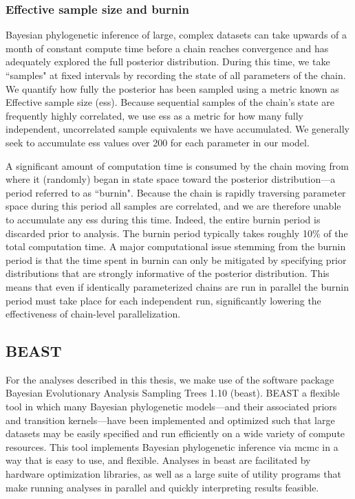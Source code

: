 \subsubsection{Effective sample size and burnin}
Bayesian phylogenetic inference of large, complex datasets can take upwards of a month of constant compute time before a chain reaches convergence and has adequately explored the full posterior distribution.
During this time, we take ``samples" at fixed intervals by recording the state of all parameters of the chain.
We quantify how fully the posterior has been sampled using a metric known as Effective sample size (\gls{ess}).
Because sequential samples of the chain's state are frequently highly correlated, we use \gls{ess} as a metric for how many fully independent, uncorrelated sample equivalents we have accumulated.
We generally seek to accumulate \gls{ess} values over 200 for each parameter in our model. 

A significant amount of computation time is consumed by the chain moving from where it (randomly) began in state space toward the posterior distribution---a period referred to as ``burnin".
Because the chain is rapidly traversing parameter space during this period all samples are correlated, and we are therefore unable to accumulate any \gls{ess} during this time.
Indeed, the entire burnin period is discarded prior to analysis.
The burnin period typically takes roughly 10\% of the total computation time.
A major computational issue stemming from the burnin period is that the time spent in burnin can only be mitigated by specifying prior distributions that are strongly informative of the posterior distribution.
This means that even if identically parameterized chains are run in parallel the burnin period must take place for each independent run, significantly lowering the effectiveness of chain-level parallelization.


\subsection{BEAST}

For the analyses described in this thesis, we make use of the software package Bayesian Evolutionary Analysis Sampling Trees 1.10 \cite{beast} (\gls{beast}).
BEAST a flexible tool in which many Bayesian phylogenetic models---and their associated priors and transition kernels---have been implemented and optimized such that large datasets may be easily specified and run efficiently on a wide variety of compute resources.
This tool implements Bayesian phylogenetic inference via \gls{mcmc} in a way that is easy to use, and flexible.
Analyses in \gls{beast} are facilitated by hardware optimization libraries\cite{beagle}, as well as a large suite of utility programs that make running analyses in parallel and quickly interpreting results feasible.

